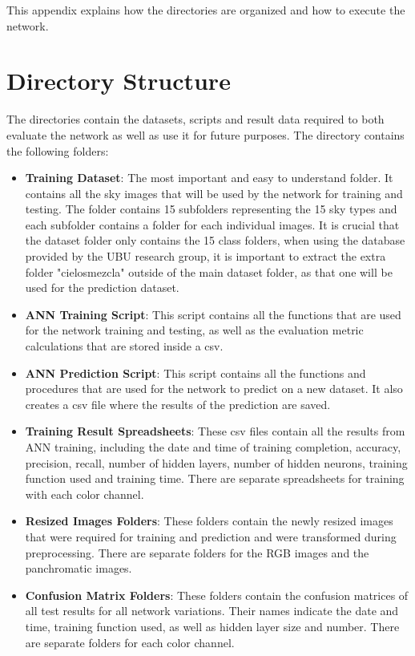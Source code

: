 This appendix explains how the directories are organized and how to execute the network.

\section{Directory Structure}
The directories contain the datasets, scripts and result data required to both evaluate the network as well as use it for future purposes. The directory contains the following folders:
\begin{itemize}
    \item \textbf{Training Dataset}: The most important and easy to understand folder. It contains all the sky images that will be used by the network for training and testing. The folder contains 15 subfolders representing the 15 sky types and each subfolder contains a folder for each individual images. It is crucial that the dataset folder only contains the 15 class folders, when using the database provided by the UBU research group, it is important to extract the extra folder "cielosmezcla" outside of the main dataset folder, as that one will be used for the prediction dataset.
    \item \textbf{ANN Training Script}: This script contains all the functions that are used for the network training and testing, as well as the evaluation metric calculations that are stored inside a csv.
    \item \textbf{ANN Prediction Script}: This script contains all the functions and procedures that are used for the network to predict on a new dataset. It also creates a csv file where the results of the prediction are saved.
    \item \textbf{Training Result Spreadsheets}: These csv files contain all the results from ANN training, including the date and time of training completion, accuracy, precision, recall, number of hidden layers, number of hidden neurons, training function used and training time. There are separate spreadsheets for training with each color channel.
    \item \textbf{Resized Images Folders}: These folders contain the newly resized images that were required for training and prediction and were transformed during preprocessing. There are separate folders for the RGB images and the panchromatic images.
    \item \textbf{Confusion Matrix Folders}: These folders contain the confusion matrices of all test results for all network variations. Their names indicate the date and time, training function used, as well as hidden layer size and number. There are separate folders for each color channel.

\end{itemize}
